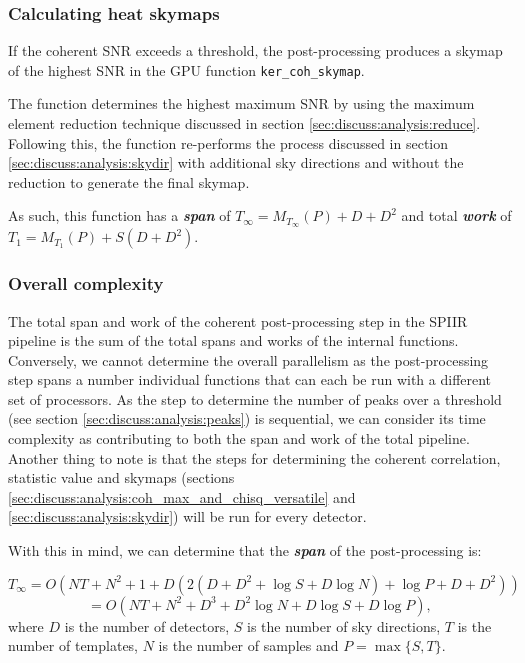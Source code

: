 \documentclass{article}
\begin{document}
\subsubsection{Calculating heat skymaps} \label{sec:discuss:analysis:coh_skymap}

If the coherent SNR exceeds a threshold, the post-processing produces a skymap of the highest SNR in the GPU function \texttt{ker\_coh\_skymap}.

The function determines the highest maximum SNR by using the maximum element reduction technique discussed in section \ref{sec:discuss:analysis:reduce}.
Following this, the function re-performs the process discussed in section \ref{sec:discuss:analysis:skydir} with additional sky directions and without the reduction to generate the final skymap.

As such, this function has a \textit{\textbf{span}} of \(T_\infty = M_{T_\infty}(P) + D + D^2\) and total \textit{\textbf{work}} of \(T_1 = M_{T_1}(P) + S(D + D^2)\).

\subsubsection{Overall complexity} \label{sec:discuss:analysis:overall}

The total span and work of the coherent post-processing step in the SPIIR pipeline is the sum of the total spans and works of the internal functions.
Conversely, we cannot determine the overall parallelism as the post-processing step spans a number individual functions that can each be run with a different set of processors.
As the step to determine the number of peaks over a threshold (see section \ref{sec:discuss:analysis:peaks}) is sequential, we can consider its time complexity as contributing to both the span and work of the total pipeline.
Another thing to note is that the steps for determining the coherent correlation, statistic value and skymaps (sections \ref{sec:discuss:analysis:coh_max_and_chisq_versatile} and \ref{sec:discuss:analysis:skydir}) will be run for every detector.

With this in mind, we can determine that the \textit{\textbf{span}} of the post-processing is:

\[
    T_\infty = O(NT + N^2 + 1 + D(2(D + D^2 + \log S + D \log N) + \log P + D + D^2))
\]
\begin{equation} \label{eq:total_span}
    = O(NT + N^2 + D^3 + D^2 \log N + D \log S + D \log P),
\end{equation}
where \(D\) is the number of detectors, \(S\) is the number of sky directions, \(T\) is the number of templates, \(N\) is the number of samples and \(P = \max\{ S, T \}\).
\end{document}
